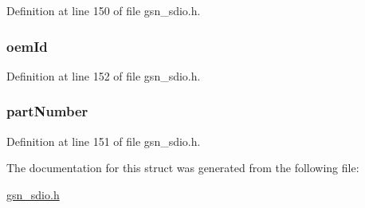 Definition at line 150 of file gsn\_\-sdio.h.

\hypertarget{a00222_a2d15def3c289b0f9e55473db950d31e9}{
\subsubsection[{oemId}]{ {\bf oemId}}}
\label{a00222_a2d15def3c289b0f9e55473db950d31e9}


Definition at line 152 of file gsn\_\-sdio.h.

\hypertarget{a00222_a274e3be0fc8f4728cd97dff3dde33268}{
\subsubsection[{partNumber}]{ {\bf partNumber}}}
\label{a00222_a274e3be0fc8f4728cd97dff3dde33268}


Definition at line 151 of file gsn\_\-sdio.h.



The documentation for this struct was generated from the following file:\begin{DoxyCompactItemize}
\item 
\hyperlink{a00584}{gsn\_\-sdio.h}\end{DoxyCompactItemize}
